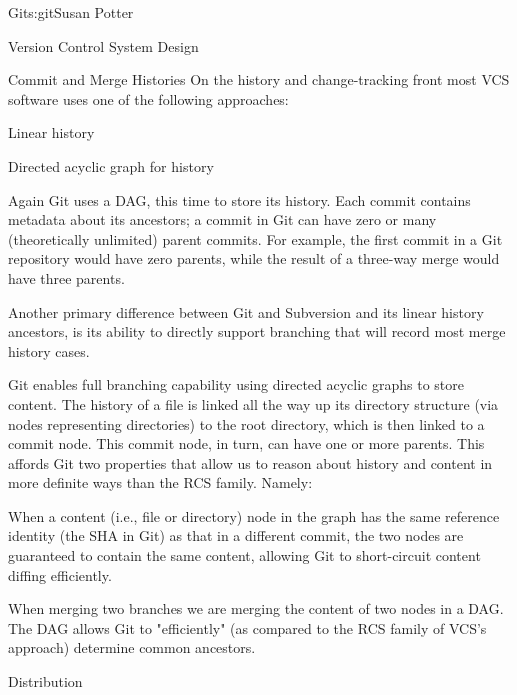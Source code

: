 \begin{aosachapter}{Git}{s:git}{Susan Potter}
\begin{aosasect1}{Version Control System Design}
\begin{aosasect2}{Commit and Merge Histories}
On the history and change-tracking front most VCS software uses one of
the following approaches:
\begin{aosaitemize}
  \item Linear history
  \item Directed acyclic graph for history
\end{aosaitemize}

Again Git uses a DAG, this time to store its history. Each commit contains
metadata about its ancestors; a commit in Git can have zero or many
(theoretically unlimited) parent commits. For example, the first commit
in a Git repository would have zero parents, while the result of a three-way merge
would have three parents.

Another primary difference between Git and Subversion and its linear history
ancestors, is its ability to directly support branching that will record
most merge history cases.


Git enables full branching capability using directed acyclic
graphs to store content. The history of a file is linked all the way
up its directory structure (via nodes representing directories) to the root
directory, which is then linked to a commit node. This commit node, in turn,
can have one or more parents. This affords Git two
properties that allow us to reason about history and content in
more definite ways than the RCS family. Namely:
\begin{aosaitemize}
  \item When a content (i.e., file or directory) node in the graph has the same
  reference identity (the SHA in Git) as that in a different commit, the two
  nodes are guaranteed to contain the same content, allowing Git to
  short-circuit content diffing efficiently.
  \item When merging two branches we are merging the content of two nodes
  in a DAG. The DAG allows Git to "efficiently" (as compared to the
  RCS family of VCS's approach) determine common ancestors.
\end{aosaitemize}

\end{aosasect2}
\begin{aosasect2}{Distribution}


\end{aosasect2}
\end{aosasect1}
\end{aosachapter}
